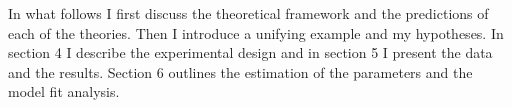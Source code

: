 \documentclass[
  12pt,
]{article}
\begin{document}
In what follows I first discuss the theoretical framework and the
predictions of each of the theories. Then I introduce a unifying example
and my hypotheses. In section 4 I describe the experimental design and
in section 5 I present the data and the results. Section 6 outlines the
estimation of the parameters and the model fit analysis.

  
\end{document}
